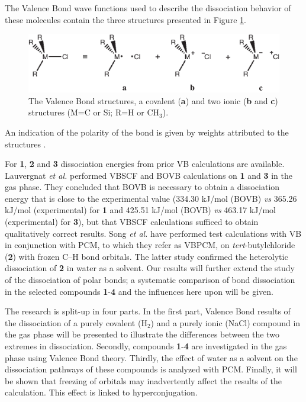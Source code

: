 The Valence Bond wave functions used to describe the dissociation behavior of these molecules contain the three structures presented in Figure \ref{ch3.fig.structures}.
\begin{figure}[htbp]
\begin{center}
\includegraphics{dissociation/figures/structures.eps}
\end{center}
\caption{The Valence Bond structures, a covalent (\textbf{a}) and two ionic (\textbf{b} and \textbf{c}) structures (M=C or Si; R=H or CH$_3$).}
\label{ch3.fig.structures}
\end{figure}
An indication of the polarity of the bond is given by weights attributed to the structures \cite{coulson}. 

For \textbf{1}, \textbf{2} and \textbf{3} dissociation energies from prior VB calculations are available. Lauvergnat \textit{et al.} \cite{lauvergnat} performed VBSCF \cite{vbscf1,vbscf2} and BOVB \cite{bovb1,bovb2,bovb3} calculations on \textbf{1} and \textbf{3} in the gas phase. They concluded that BOVB is necessary to obtain a dissociation energy that is close to the experimental value (334.30 kJ/mol (BOVB) \textit{vs} 365.26 kJ/mol (experimental) for \textbf{1} and 425.51 kJ/mol (BOVB) \textit{vs} 463.17 kJ/mol (experimental) for \textbf{3}), but that VBSCF calculations sufficed to obtain qualitatively correct results.  Song \textit{et al.} \cite{song} have performed test calculations with VB in conjunction with PCM, to which they refer as VBPCM, on \textit{tert}-butylchloride (\textbf{2}) with frozen C--H bond orbitals. The latter study confirmed the heterolytic dissociation of \textbf{2} in water as a solvent.  Our results will further extend the study of the dissociation of polar bonds; a systematic comparison of bond dissociation in the selected compounds \textbf{1}-\textbf{4} and the influences here upon will be given.

The research is split-up in four parts.  In the first part, Valence Bond results of the dissociation of a purely covalent (H$_2$) and a purely ionic (NaCl) compound in the gas phase will be presented to illustrate the differences between the two extremes in dissociation.
Secondly, compounds \textbf{1}-\textbf{4} are investigated in the gas phase using Valence Bond theory. Thirdly, the effect of water as a solvent on the dissociation pathways of these compounds is analyzed with PCM. Finally, it will be shown that freezing of orbitals may inadvertently affect the results of the calculation. This effect is linked to hyperconjugation.

